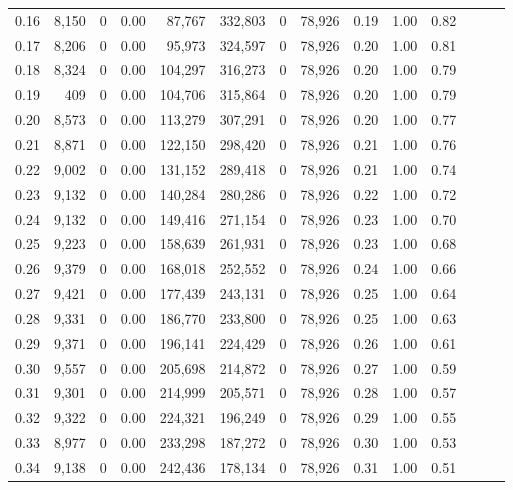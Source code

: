 \begin{tabular}{rrrrrrrrrrrrrr}
0.16 &  8,150 &      0 &  0.00 &   87,767 &  332,803 &       0 &  78,926 &  0.19 &  1.00 &      0.82 \\
0.17 &  8,206 &      0 &  0.00 &   95,973 &  324,597 &       0 &  78,926 &  0.20 &  1.00 &      0.81 \\
0.18 &  8,324 &      0 &  0.00 &  104,297 &  316,273 &       0 &  78,926 &  0.20 &  1.00 &      0.79 \\
0.19 &    409 &      0 &  0.00 &  104,706 &  315,864 &       0 &  78,926 &  0.20 &  1.00 &      0.79 \\
0.20 &  8,573 &      0 &  0.00 &  113,279 &  307,291 &       0 &  78,926 &  0.20 &  1.00 &      0.77 \\
0.21 &  8,871 &      0 &  0.00 &  122,150 &  298,420 &       0 &  78,926 &  0.21 &  1.00 &      0.76 \\
0.22 &  9,002 &      0 &  0.00 &  131,152 &  289,418 &       0 &  78,926 &  0.21 &  1.00 &      0.74 \\
0.23 &  9,132 &      0 &  0.00 &  140,284 &  280,286 &       0 &  78,926 &  0.22 &  1.00 &      0.72 \\
0.24 &  9,132 &      0 &  0.00 &  149,416 &  271,154 &       0 &  78,926 &  0.23 &  1.00 &      0.70 \\
0.25 &  9,223 &      0 &  0.00 &  158,639 &  261,931 &       0 &  78,926 &  0.23 &  1.00 &      0.68 \\
0.26 &  9,379 &      0 &  0.00 &  168,018 &  252,552 &       0 &  78,926 &  0.24 &  1.00 &      0.66 \\
0.27 &  9,421 &      0 &  0.00 &  177,439 &  243,131 &       0 &  78,926 &  0.25 &  1.00 &      0.64 \\
0.28 &  9,331 &      0 &  0.00 &  186,770 &  233,800 &       0 &  78,926 &  0.25 &  1.00 &      0.63 \\
0.29 &  9,371 &      0 &  0.00 &  196,141 &  224,429 &       0 &  78,926 &  0.26 &  1.00 &      0.61 \\
0.30 &  9,557 &      0 &  0.00 &  205,698 &  214,872 &       0 &  78,926 &  0.27 &  1.00 &      0.59 \\
0.31 &  9,301 &      0 &  0.00 &  214,999 &  205,571 &       0 &  78,926 &  0.28 &  1.00 &      0.57 \\
0.32 &  9,322 &      0 &  0.00 &  224,321 &  196,249 &       0 &  78,926 &  0.29 &  1.00 &      0.55 \\
0.33 &  8,977 &      0 &  0.00 &  233,298 &  187,272 &       0 &  78,926 &  0.30 &  1.00 &      0.53 \\
0.34 &  9,138 &      0 &  0.00 &  242,436 &  178,134 &       0 &  78,926 &  0.31 &  1.00 &      0.51 \\

\end{tabular}
